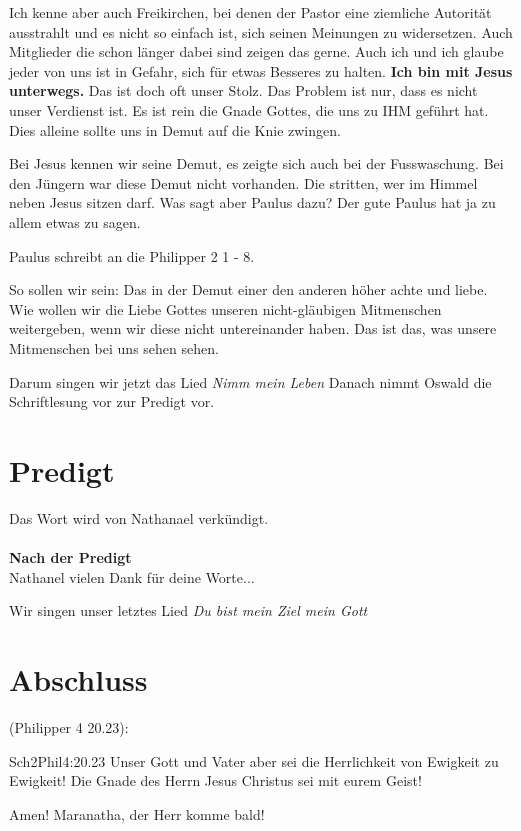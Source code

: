 \documentclass{../inc/mybib}
\begin{document}
Ich kenne aber auch Freikirchen, bei denen der Pastor eine ziemliche Autorität ausstrahlt und es nicht so einfach ist, sich seinen Meinungen zu widersetzen. Auch Mitglieder die schon länger \glqq dabei sind\grqq{} zeigen das gerne. Auch ich und ich glaube jeder von uns ist in Gefahr, sich für etwas Besseres zu halten. \textbf{Ich bin mit Jesus unterwegs.} Das ist doch oft unser Stolz. Das Problem ist nur, dass es nicht unser Verdienst ist. Es ist rein die Gnade Gottes, die uns zu IHM geführt hat. Dies alleine sollte uns in Demut auf die Knie zwingen.

Bei Jesus kennen wir seine Demut, es zeigte sich auch bei der Fusswaschung. Bei den Jüngern war diese Demut nicht vorhanden. Die stritten, wer im Himmel neben Jesus sitzen darf. Was sagt aber Paulus dazu? Der gute Paulus hat ja zu allem etwas zu sagen.

Paulus schreibt an die Philipper 2 1 - 8.

So sollen wir sein: Das in der Demut einer den anderen höher achte und liebe. Wie wollen wir die Liebe Gottes unseren nicht-gläubigen Mitmenschen weitergeben, wenn wir diese nicht untereinander haben. Das ist das, was unsere Mitmenschen bei uns sehen sehen.

Darum singen wir jetzt das Lied \textit{Nimm mein Leben}
Danach nimmt Oswald die Schriftlesung vor zur Predigt vor.

\section{Predigt}
Das Wort wird von Nathanael verkündigt.
\\
\\
\textbf{Nach der Predigt}\\
Nathanel vielen Dank für deine Worte...

Wir singen unser letztes Lied \textit{Du bist mein Ziel mein Gott}

\section{Abschluss}
(Philipper 4 20.23):
\begin{bibeltext}{Sch2}{Phil}{4:20.23}
Unser Gott und Vater aber sei die Herrlichkeit von Ewigkeit zu Ewigkeit!
Die Gnade des Herrn Jesus Christus sei mit eurem Geist!
\end{bibeltext}
Amen! Maranatha, der Herr komme bald!
\end{document}

